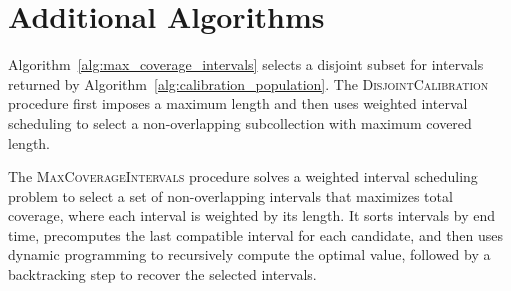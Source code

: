 \documentclass[11pt]{article}
\theoremstyle{statplain}
\theoremstyle{statdefinition}
\newcommand{\0}{\mathbf{0}}
\begin{document}
\section{Additional Algorithms}\label{app:alg}

Algorithm~\ref{alg:max_coverage_intervals} selects a disjoint subset for intervals returned by Algorithm~\ref{alg:calibration_population}. The \textsc{DisjointCalibration} procedure first imposes a maximum length and
then uses weighted interval scheduling to select a non-overlapping subcollection with maximum covered length. 

The \textsc{MaxCoverageIntervals} procedure solves a weighted interval scheduling problem to select a set of non-overlapping intervals that maximizes total coverage, where each interval is weighted by its length. It sorts intervals by end time, precomputes the last compatible interval for each candidate, and then uses dynamic programming to recursively compute the optimal value, followed by a backtracking step to recover the selected intervals.
\end{document}
